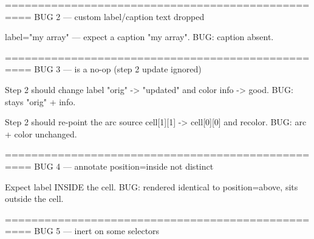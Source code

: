 ==================================================
BUG 2 — custom label/caption text dropped

\apply label="my array" — expect a caption "my array". BUG: caption absent.

\begin{animation}[id="b2a", label="apply label"]
\step
{}
\end{animation}

==================================================
BUG 3 — \reannotate is a no-op (step 2 update ignored)

Step 2 should change label "orig" -> "updated" and color info -> good. BUG: stays "orig" + info.

\begin{animation}[id="b3a", label="reannotate label"]
\step[label=s1]
\step[label=s2]
\end{animation}

Step 2 should re-point the arc source cell[1][1] -> cell[0][0] and recolor. BUG: arc + color unchanged.

\begin{animation}[id="b3b", label="reannotate arrow_from"]
\step[label=s1]
\step[label=s2]
\end{animation}

==================================================
BUG 4 — annotate position=inside not distinct

Expect label INSIDE the cell. BUG: rendered identical to position=above, sits outside the cell.

\begin{animation}[id="b4a", label="annotate position inside"]
\step[label=s1]
\end{animation}

==================================================
BUG 5 — \recolor inert on some selectors


